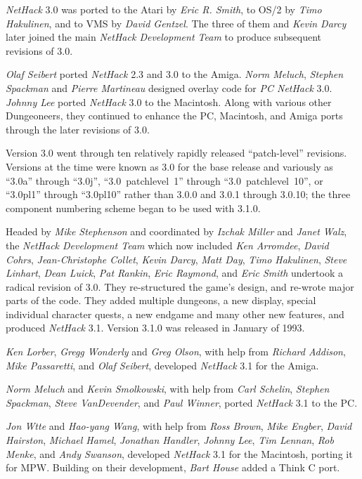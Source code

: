 \documentclass[titlepage]{article}
\begin{document}
\medskip
\noindent \textit{NetHack} 3.0 was ported to the Atari by \textit{Eric R. Smith}, to OS/2 by
\textit{Timo Hakulinen}, and to VMS by \textit{David Gentzel}.  The three of them
and \textit{Kevin Darcy} later joined the main \textit{NetHack Development Team} to produce
subsequent revisions of 3.0.

\medskip
\noindent \textit{Olaf Seibert} ported \textit{NetHack} 2.3 and 3.0 to the Amiga.  {\it
Norm Meluch}, \textit{Stephen Spackman} and \textit{Pierre Martineau} designed
overlay code for \textit{PC NetHack} 3.0.  \textit{Johnny Lee} ported
\textit{NetHack} 3.0 to the Macintosh.  Along with various other Dungeoneers, they
continued to enhance the PC, Macintosh, and Amiga ports through the later
revisions of 3.0.

Version 3.0 went through ten relatively rapidly released ``patch-level''
revisions.
Versions at the time were known as 3.0 for the base release and variously
as ``3.0a'' through ``3.0j'',
``3.0~patchlevel~1'' through ``3.0~patchlevel~10'',
or ``3.0pl1'' through ``3.0pl10''
rather than 3.0.0 and 3.0.1 through 3.0.10;
the three component numbering scheme began to be used with 3.1.0.

\medskip
\noindent Headed by \textit{Mike Stephenson} and coordinated by \textit{Izchak Miller}
and \textit{Janet Walz}, the \textit{NetHack Development Team} which now included
\textit{Ken Arromdee},
\textit{David Cohrs}, \textit{Jean-Christophe Collet}, \textit{Kevin Darcy},
\textit{Matt Day}, \textit{Timo Hakulinen}, \textit{Steve Linhart}, \textit{Dean Luick},
\textit{Pat Rankin}, \textit{Eric Raymond}, and \textit{Eric Smith} undertook a
radical revision of 3.0.
They re-structured the game's design, and re-wrote major
parts of the code.
They added multiple dungeons, a new display, special
individual character quests, a new endgame and many other new features, and
produced \textit{NetHack} 3.1.
Version 3.1.0 was released in January of 1993.

\medskip
\noindent \textit{Ken Lorber}, \textit{Gregg Wonderly} and \textit{Greg Olson}, with help
from \textit{Richard Addison}, \textit{Mike Passaretti}, and \textit{Olaf Seibert},
developed \textit{NetHack} 3.1 for the Amiga.

\medskip
\noindent \textit{Norm Meluch} and \textit{Kevin Smolkowski}, with help from
\textit{Carl Schelin}, \textit{Stephen Spackman}, \textit{Steve VanDevender},
and \textit{Paul Winner}, ported \textit{NetHack} 3.1 to the PC.

\medskip
\noindent \textit{Jon W\textbraceleft tte} and \textit{Hao-yang Wang},
with help from \textit{Ross Brown}, \textit{Mike Engber}, \textit{David Hairston},
\textit{Michael Hamel}, \textit{Jonathan Handler}, \textit{Johnny Lee},
\textit{Tim Lennan}, \textit{Rob Menke}, and \textit{Andy Swanson},
developed \textit{NetHack} 3.1 for the Macintosh, porting it for MPW.
Building on their development, \textit{Bart House} added a Think C port.
\end{document}
